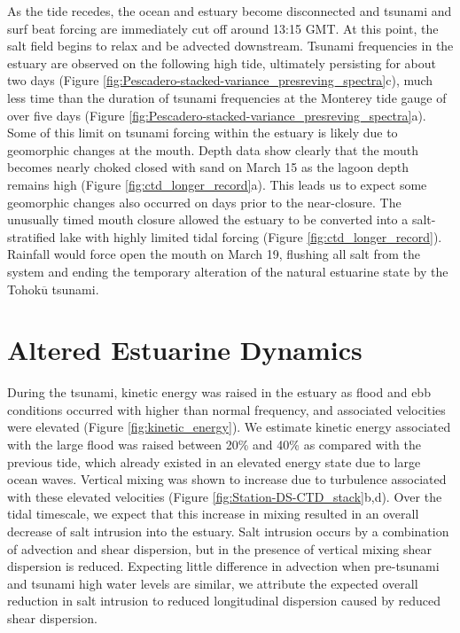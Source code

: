 As the tide recedes, the ocean and estuary become disconnected and
tsunami and surf beat forcing are immediately cut off around 13:15
GMT. At this point, the salt field begins to relax and be advected
downstream. Tsunami frequencies in the estuary are observed on the
following high tide, ultimately persisting for about two days (Figure
\ref{fig:Pescadero-stacked-variance_presreving_spectra}c), much less
time than the duration of tsunami frequencies at the Monterey tide
gauge of over five days (Figure \ref{fig:Pescadero-stacked-variance_presreving_spectra}a).
Some of this limit on tsunami forcing within the estuary is likely
due to geomorphic changes at the mouth. Depth data show clearly that
the mouth becomes nearly choked closed with sand on March 15 as the
lagoon depth remains high (Figure \ref{fig:ctd_longer_record}a).
This leads us to expect some geomorphic changes also occurred on days
prior to the near-closure. The unusually timed mouth closure allowed
the estuary to be converted into a salt-stratified lake with highly
limited tidal forcing (Figure \ref{fig:ctd_longer_record}). Rainfall
would force open the mouth on March 19, flushing all salt from the
system and ending the temporary alteration of the natural estuarine
state by the Tohok$\overline{\mathrm{u}}$ tsunami. 


\section{Altered Estuarine Dynamics}

During the tsunami, kinetic energy was raised in the estuary as flood
and ebb conditions occurred with higher than normal frequency, and
associated velocities were elevated (Figure \ref{fig:kinetic_energy}).
We estimate kinetic energy associated with the large flood was raised
between 20\% and 40\% as compared with the previous tide, which already
existed in an elevated energy state due to large ocean waves. Vertical
mixing was shown to increase due to turbulence associated with these
elevated velocities (Figure \ref{fig:Station-DS-CTD_stack}b,d). Over
the tidal timescale, we expect that this increase in mixing resulted
in an overall decrease of salt intrusion into the estuary. Salt intrusion
occurs by a combination of advection and shear dispersion, but in
the presence of vertical mixing shear dispersion is reduced. Expecting
little difference in advection when pre-tsunami and tsunami high water
levels are similar, we attribute the expected overall reduction in
salt intrusion to reduced longitudinal dispersion caused by reduced
shear dispersion. 

